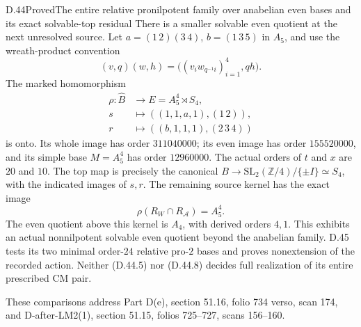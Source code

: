\begin{statement}{D.44}{Proved}{The entire relative pronilpotent family over anabelian even bases and its exact solvable-top residual}
There is a smaller solvable even quotient at the next unresolved
source. Let \(a=(1\,2)(3\,4)\), \(b=(1\,3\,5)\) in \(A_5\),
and use the wreath-product convention
\[
 (v,q)(w,h)=\bigl((v_iw_{q^{-1}i})_{i=1}^4,qh\bigr).
\]
The marked homomorphism
\[
 \begin{split}
 \rho:\widehat B&\longrightarrow E=A_5^4\rtimes S_4,\\
 s&\longmapsto((1,1,a,1),(1\,2)),\\
 r&\longmapsto((b,1,1,1),(2\,3\,4))
 \end{split}                                                   \tag{D.44.7}
\]
is onto. Its whole image has order \(311040000\); its even
image has order \(155520000\), and its simple base
\(M=A_5^4\) has order \(12960000\).
The actual orders of \(t\) and \(x\) are \(20\) and \(10\).
The top map is precisely the canonical
\(B\to\mathrm{SL}_2(\mathbb Z/4)/\{\pm I\}\simeq S_4\),
with the indicated images of \(s,r\). The remaining source kernel
has the exact image
\[
              \rho(R_W\cap R_{\mathscr A})=A_5^4.              \tag{D.44.8}
\]
The even quotient above this kernel is \(A_4\), with derived
orders \(4,1\). This exhibits an actual nonnilpotent solvable
even quotient beyond the anabelian family. D.45 tests its two
minimal order-\(24\) relative pro-\(2\) bases and proves
nonextension of the recorded action. Neither (D.44.5) nor
(D.44.8) decides full realization of its entire prescribed CM pair.

These comparisons address Part D(e), section 51.16,
folio 734 verso, scan 174, and D-after-LM2(1),
section 51.15, folios 725--727, scans 156--160.
\end{statement}
